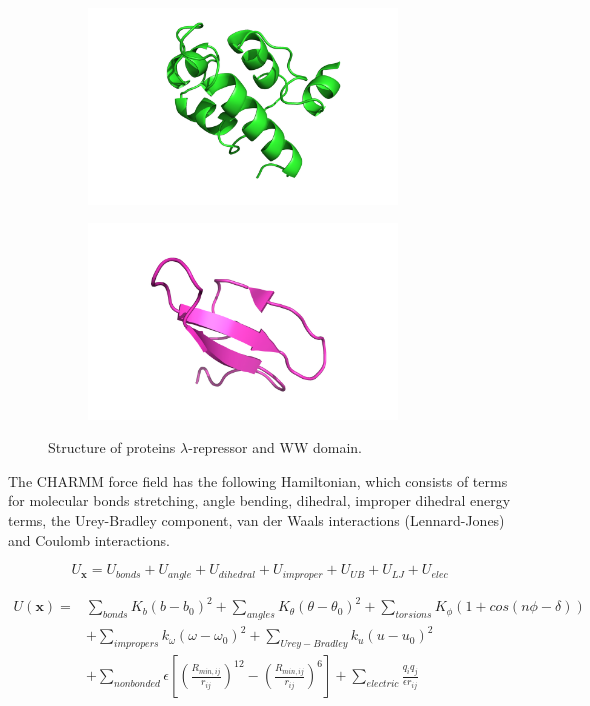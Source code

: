 \begin{figure}[H]
  \centering
  \begin{subfigure}[t]{0.45\textwidth}
    \includegraphics[width=0.9\textwidth]{figures3/lambda-repressor.png} 
  \end{subfigure}
  \begin{subfigure}[t]{0.45\textwidth}
    \includegraphics[width=0.9\textwidth]{figures3/ww-domain.png}  
  \end{subfigure}
  \caption{Structure of proteins $\lambda$-repressor and WW domain.}
  \label{fig:proteins}
\end{figure}


The CHARMM force field has the following Hamiltonian, which consists of terms for molecular bonds stretching, angle bending, dihedral, improper dihedral energy terms, the Urey-Bradley component, van der Waals interactions (Lennard-Jones) and Coulomb interactions. 

$$U_{\mathbf{x}}=U_{bonds}+U_{angle}+U_{dihedral}+U_{improper}+U_{UB}+U_{LJ}+U_{elec}$$

\begin{equation}
\begin{aligned}
U(\mathbf{x})={} &\sum_{bonds}K_{b}(b-b_{0})^{2}+\sum_{angles}K_{\theta}(\theta-\theta_{0})^{2}+\sum_{torsions}K_{\phi}\left(1+cos(n\phi-\delta)\right)\\
&+\sum_{impropers}k_{\omega}\left(\omega-\omega_{0}\right)^{2}+\sum_{Urey-Bradley}k_{u}\left(u-u_{0}\right)^{2}\\
&+\sum_{nonbonded}\epsilon\left[\left(\frac{R_{min,ij}}{r_{ij}}\right)^{12}-\left(\frac{R_{min,ij}}{r_{ij}}\right)^{6}\right]+\sum_{electric}\frac{q_{i}q_{j}}{\epsilon r_{ij}}
\end{aligned}
\end{equation}

